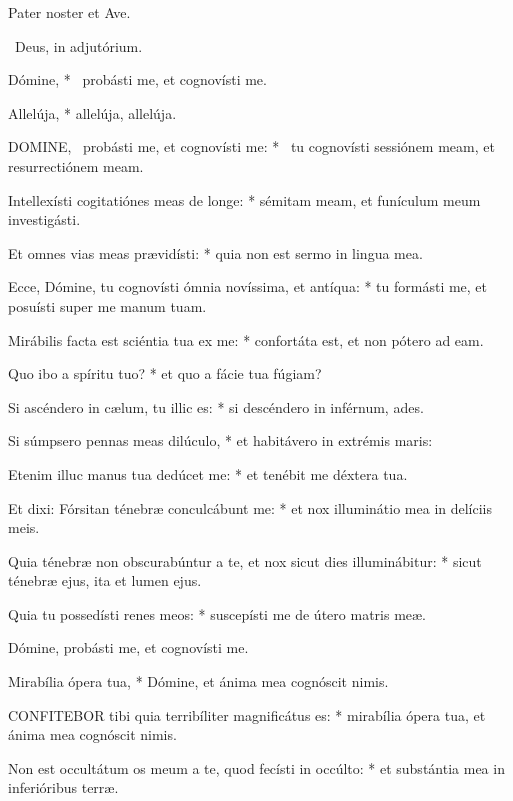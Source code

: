 
Pater noster et Ave.

\V\ Deus, in adjutórium.


 Dómine, * \textdagger\ probásti me, et cognovísti me. \textdaggerdbl


 Allelúja, * allelúja, allelúja.


\lettrine[lines=2]{D}{OMINE}, \textdagger\ probásti me, et cognovísti me: * \textdaggerdbl\ tu cognovísti sessiónem meam, et resurrectiónem meam.

Intellexísti cogitatiónes meas de longe: * sémitam meam, et funículum meum investigásti.

Et omnes vias meas prævidísti: * quia non est sermo in lingua mea.

Ecce, Dómine, tu cognovísti ómnia novíssima, et antíqua: * tu formásti me, et posuísti super me manum tuam.

Mirábilis facta est sciéntia tua ex me: * confortáta est, et non pótero ad eam.

Quo ibo a spíritu tuo? * et quo a fácie tua fúgiam?

Si ascéndero in cælum, tu illic es: * si descéndero in inférnum, ades.

Si súmpsero pennas meas dilúculo, * et habitávero in extrémis maris:

Etenim illuc manus tua dedúcet me: * et tenébit me déxtera tua.

Et dixi: Fórsitan ténebræ conculcábunt me: * et nox illuminátio mea in delíciis meis.

Quia ténebræ non obscurabúntur a te, et nox sicut dies illuminábitur: * sicut ténebræ ejus, ita et lumen ejus.

Quia tu possedísti renes meos: * suscepísti me de útero matris meæ.

 Dómine, probásti me, et cognovísti me.

 Mirabília ópera tua, * Dómine, et ánima mea cognóscit nimis.


\lettrine[lines=2]{C}{ONFITEBOR} tibi quia terribíliter magnificátus es: * mirabília ópera tua, et ánima mea cognóscit nimis.

Non est occultátum os meum a te, quod fecísti in occúlto: * et substántia mea in inferióribus terræ.

